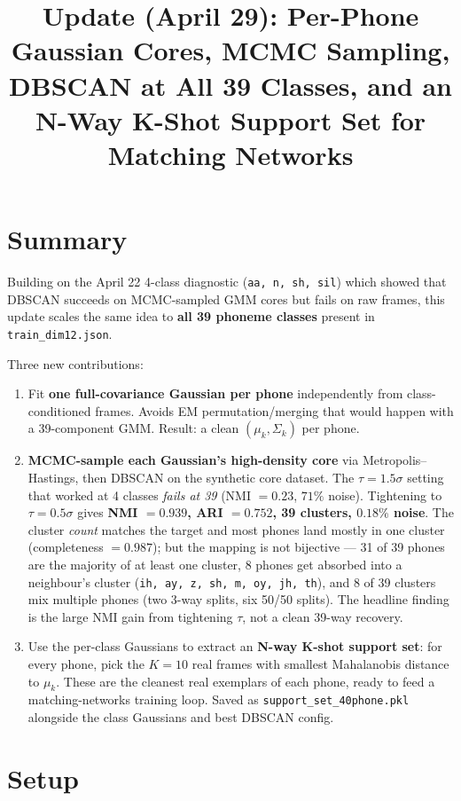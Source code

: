\documentclass[11pt]{article}
\title{Update (April 29): Per-Phone Gaussian Cores, MCMC Sampling, DBSCAN at All 39 Classes, and an N-Way K-Shot Support Set for Matching Networks}
\author{}
\date{}
\begin{document}
\maketitle
\thispagestyle{empty}

\section*{Summary}

Building on the April 22 4-class diagnostic (\texttt{aa, n, sh, sil}) which showed that DBSCAN succeeds on MCMC-sampled GMM cores but fails on raw frames, this update scales the same idea to \textbf{all 39 phoneme classes} present in \texttt{train\_dim12.json}.

Three new contributions:
\begin{enumerate}
\item Fit \textbf{one full-covariance Gaussian per phone} independently from class-conditioned frames. Avoids EM permutation/merging that would happen with a 39-component GMM. Result: a clean $(\mu_k, \Sigma_k)$ per phone.
\item \textbf{MCMC-sample each Gaussian's high-density core} via Metropolis--Hastings, then DBSCAN on the synthetic core dataset. The $\tau = 1.5\sigma$ setting that worked at 4 classes \emph{fails at 39} (NMI $= 0.23$, $71\%$ noise). Tightening to $\tau = 0.5\sigma$ gives \textbf{NMI $= 0.939$, ARI $= 0.752$, 39 clusters, $0.18\%$ noise}. The cluster \emph{count} matches the target and most phones land mostly in one cluster (completeness $= 0.987$); but the mapping is not bijective --- 31 of 39 phones are the majority of at least one cluster, 8 phones get absorbed into a neighbour's cluster (\texttt{ih, ay, z, sh, m, oy, jh, th}), and 8 of 39 clusters mix multiple phones (two 3-way splits, six 50/50 splits). The headline finding is the large NMI gain from tightening $\tau$, not a clean 39-way recovery.
\item Use the per-class Gaussians to extract an \textbf{N-way K-shot support set}: for every phone, pick the $K = 10$ real frames with smallest Mahalanobis distance to $\mu_k$. These are the cleanest real exemplars of each phone, ready to feed a matching-networks training loop. Saved as \texttt{support\_set\_40phone.pkl} alongside the class Gaussians and best DBSCAN config.
\end{enumerate}

\section*{Setup}
\end{document}
